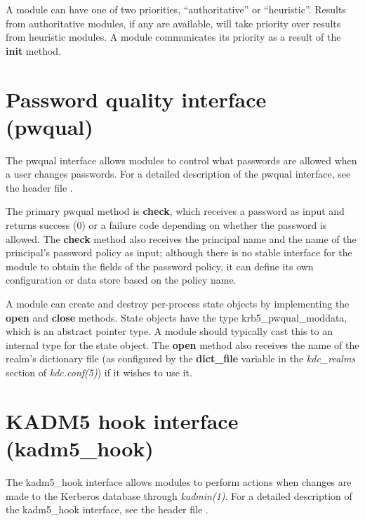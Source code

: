 \documentclass[letterpaper,10pt,english]{sphinxmanual}
\begin{document}
A module can have one of two priorities, ``authoritative'' or
``heuristic''.  Results from authoritative modules, if any are
available, will take priority over results from heuristic modules.  A
module communicates its priority as a result of the \textbf{init} method.


\section{Password quality interface (pwqual)}
\label{plugindev/pwqual::doc}\label{plugindev/pwqual:password-quality-interface-pwqual}\label{plugindev/pwqual:pwqual-plugin}
The pwqual interface allows modules to control what passwords are
allowed when a user changes passwords.  For a detailed description of
the pwqual interface, see the header file .

The primary pwqual method is \textbf{check}, which receives a password as
input and returns success (0) or a  failure code
depending on whether the password is allowed.  The \textbf{check} method
also receives the principal name and the name of the principal's
password policy as input; although there is no stable interface for
the module to obtain the fields of the password policy, it can define
its own configuration or data store based on the policy name.

A module can create and destroy per-process state objects by
implementing the \textbf{open} and \textbf{close} methods.  State objects have
the type krb5\_pwqual\_moddata, which is an abstract pointer type.  A
module should typically cast this to an internal type for the state
object.  The \textbf{open} method also receives the name of the realm's
dictionary file (as configured by the \textbf{dict\_file} variable in the
\emph{kdc\_realms} section of \emph{kdc.conf(5)}) if it wishes to use
it.


\section{KADM5 hook interface (kadm5\_hook)}
\label{plugindev/kadm5_hook:kadm5-hook-interface-kadm5-hook}\label{plugindev/kadm5_hook::doc}\label{plugindev/kadm5_hook:kadm5-hook-plugin}
The kadm5\_hook interface allows modules to perform actions when
changes are made to the Kerberos database through \emph{kadmin(1)}.
For a detailed description of the kadm5\_hook interface, see the header
file .
\end{document}
